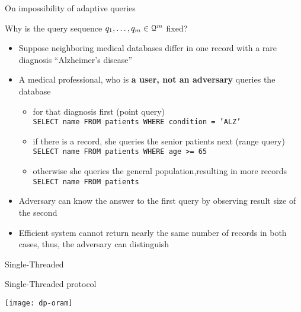 	\begin{frame}{On impossibility of adaptive queries}

		\begin{block}{Why is the query sequence $\fromNtoM{\query}{1}{m} \in \querySet^m$ fixed?}
			\justify%

			\begin{itemize}
				\item<1-> Suppose neighboring medical databases differ in one record with a rare diagnosis ``Alzheimer's disease''
				\item<2-> A medical professional, who is \textbf{a user, not an adversary} queries the database
					\begin{itemize}
						\item
							for that diagnosis first (point query) \\
							\texttt{SELECT name FROM patients WHERE condition = 'ALZ'} %

						\item
							if there is a record, she queries the senior patients next (range query) \\
							\texttt{SELECT name FROM patients WHERE age >= 65}

						\item
							otherwise she queries the general population,resulting in more records \\
							\texttt{SELECT name FROM patients}
					\end{itemize}
				\item<3-> \alert{Adversary can know the answer to the first query by observing result size of the second}
				\item<3-> Efficient system cannot return nearly the same number of records in both cases, thus, the adversary can distinguish
			\end{itemize}

		\end{block}

	\end{frame}

	\begin{frame}{Single-Threaded \epsolute{}}

		\begin{block}{Single-Threaded \epsolute{} protocol}

			\vspace*{2ex}
			\centering
			\texttt{[image: dp-oram]}

		\end{block}

	\end{frame}

